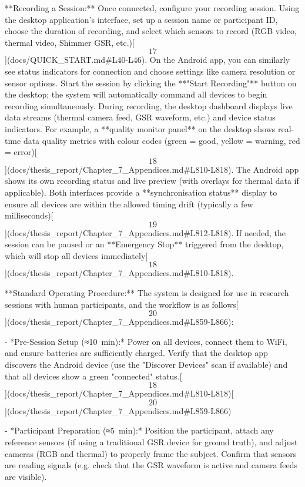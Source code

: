 \documentclass[12pt,a4paper]{article}
\begin{document}
{**Recording a Session:** Once connected, configure your recording
session. Using the desktop application's interface, set up a session
name or participant ID, choose the duration of recording, and select
which sensors to record (RGB video, thermal video, Shimmer GSR,
etc.)[\[17\]](docs/QUICK_START.md#L40-L46).
On the Android app, you can similarly see status indicators for
connection and choose settings like camera resolution or sensor options.
Start the session by clicking the **"Start Recording"** button on the
desktop; the system will automatically command all devices to begin
recording simultaneously. During recording, the desktop dashboard
displays live data streams (thermal camera feed, GSR waveform, etc.) and
device status indicators. For example, a **quality monitor panel** on
the desktop shows real-time data quality metrics with colour codes (green
= good, yellow = warning, red =
error)[\[18\]](docs/thesis_report/Chapter_7_Appendices.md#L810-L818).
The Android app shows its own recording status and live preview (with
overlays for thermal data if applicable). Both interfaces provide a
**synchronisation status** display to ensure all devices are within the
allowed timing drift (typically a few
milliseconds)[\[19\]](docs/thesis_report/Chapter_7_Appendices.md#L812-L818).
If needed, the session can be paused or an **Emergency Stop** triggered
from the desktop, which will stop all devices
immediately[\[18\]](docs/thesis_report/Chapter_7_Appendices.md#L810-L818).

**Standard Operating Procedure:** The system is designed for use in
research sessions with human participants, and the workflow is as
follows[\[20\]](docs/thesis_report/Chapter_7_Appendices.md#L859-L866):

- *Pre-Session Setup (≈10 min):* Power on all devices, connect them to
  WiFi, and ensure batteries are sufficiently charged. Verify that the
  desktop app discovers the Android device (use the "Discover Devices"
  scan if available) and that all devices show a green "connected"
  status.[\[18\]](docs/thesis_report/Chapter_7_Appendices.md#L810-L818)[\[20\]](docs/thesis_report/Chapter_7_Appendices.md#L859-L866)

- *Participant Preparation (≈5 min):* Position the participant, attach
  any reference sensors (if using a traditional GSR device for ground
  truth), and adjust cameras (RGB and thermal) to properly frame the
  subject. Confirm that sensors are reading signals (e.g. check that the
  GSR waveform is active and camera feeds are visible).

}
\end{document}
